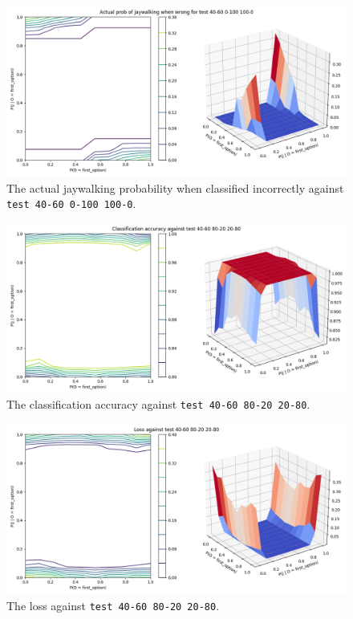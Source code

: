 \documentclass{report}
\newcommand{\code}{\texttt}
\begin{document}
\begin{figure}[h]
    \centering
    \includegraphics[width=\textwidth]{test_40-60_0-100_100-0_jay_prob.png}
    \caption[]{The actual jaywalking probability when classified incorrectly against \code{test 40-60 0-100 100-0}.}
    \label{fig:test_40-60_0-100_100-0_jay_prob_plot}
\end{figure}

% 
% 

\begin{figure}[h]
    \centering
    \includegraphics[width=\textwidth]{test_40-60_80-20_20-80_accuracy.png}
    \caption[]{The classification accuracy against \code{test 40-60 80-20 20-80}.}
    \label{fig:test_40-60_80-20_20-80_accuracy_plot}
\end{figure}

\begin{figure}[h]
    \centering
    \includegraphics[width=\textwidth]{test_40-60_80-20_20-80_loss.png}
    \caption[]{The loss against \code{test 40-60 80-20 20-80}.}
    \label{fig:test_40-60_80-20_20-80_loss_plot}
\end{figure}
\end{document}
